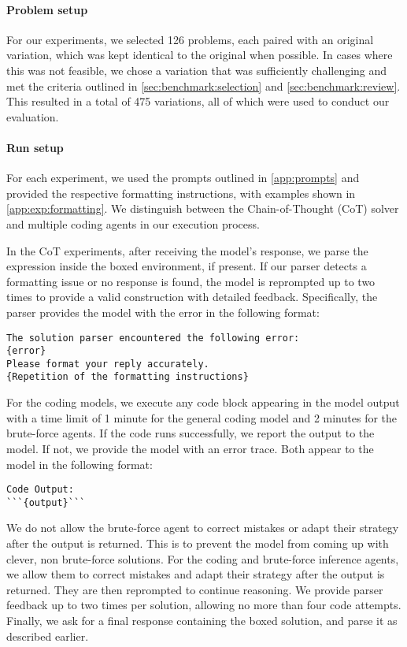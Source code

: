 \paragraph{Problem setup}

For our experiments, we selected 126 problems, each paired with an original variation, which was kept identical to the original when possible. In cases where this was not feasible, we chose a variation that was sufficiently challenging and met the criteria outlined in \cref{sec:benchmark:selection} and \cref{sec:benchmark:review}. This resulted in a total of 475 variations, all of which were used to conduct our evaluation.

\paragraph{Run setup}
For each experiment, we used the prompts outlined in \cref{app:prompts} and provided the respective formatting instructions, with examples shown in \cref{app:exp:formatting}. We distinguish between the Chain-of-Thought (CoT) solver and multiple coding agents in our execution process.

In the CoT experiments, after receiving the model's response, we parse the expression inside the boxed environment, if present. If our parser detects a formatting issue or no response is found, the model is reprompted up to two times to provide a valid construction with detailed feedback. Specifically, the parser provides the model with the error in the following format: 

\begin{verbatim}
The solution parser encountered the following error:
{error}
Please format your reply accurately.
{Repetition of the formatting instructions}
\end{verbatim}

For the coding models, we execute any code block appearing in the model output with a time limit of 1 minute for the general coding model and 2 minutes for the brute-force agents. If the code runs successfully, we report the output to the model. If not, we provide the model with an error trace. Both appear to the model in the following format:

\begin{verbatim}
Code Output:
```{output}```
\end{verbatim}

We do not allow the brute-force agent to correct mistakes or adapt their strategy after the output is returned. This is to prevent the model from coming up with clever, non brute-force solutions. For the coding and brute-force inference agents, we allow them to correct mistakes and adapt their strategy after the output is returned. They are then reprompted to continue reasoning. We provide parser feedback up to two times per solution, allowing no more than four code attempts. Finally, we ask for a final response containing the boxed solution, and parse it as described earlier.


